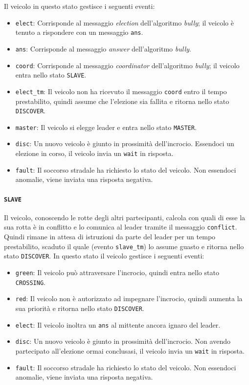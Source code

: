\documentclass{memoir}
\begin{document}
Il veicolo in questo stato gestisce i seguenti eventi:
\begin{itemize}
\item \texttt{elect}: Corrisponde al messaggio \emph{election} dell'algoritmo
  \emph{bully}; il veicolo è tenuto a rispondere con un messaggio \texttt{ans}.
\item \texttt{ans}: Corrisponde al messaggio \emph{answer} dell'algoritmo
  \emph{bully}.
\item \texttt{coord}: Corrisponde al messaggio \emph{coordinator} dell'algoritmo
  \emph{bully}; il veicolo entra nello stato \texttt{SLAVE}.
\item \texttt{elect\_tm}: Il veicolo non ha ricevuto il messaggio \texttt{coord}
  entro il tempo prestabilito, quindi assume che l'elezione sia fallita e
  ritorna nello stato \texttt{DISCOVER}.
\item \texttt{master}: Il veicolo si elegge leader e entra nello stato
  \texttt{MASTER}.
\item \texttt{disc}: Un nuovo veicolo è giunto in prossimità dell'incrocio.
  Essendoci un elezione in corso, il veicolo invia un \texttt{wait} in risposta.
\item \texttt{fault}: Il soccorso stradale ha richiesto lo stato del veicolo.
  Non essendoci anomalie, viene inviata una risposta negativa.
\end{itemize}

\paragraph{\texttt{SLAVE}}
Il veicolo, conoscendo le rotte degli altri partecipanti, calcola con quali di
esse la sua rotta è in conflitto e lo comunica al leader tramite il messaggio
\texttt{conflict}. Quindi rimane in attesa di istruzioni da parte del leader per
un tempo prestabilito, scaduto il quale (evento \texttt{slave\_tm}) lo assume
guasto e ritorna nello stato \texttt{DISCOVER}. In questo stato il veicolo
gestisce i seguenti eventi:
\begin{itemize}
\item \texttt{green}: Il veicolo può attraversare l'incrocio, quindi entra nello
  stato \texttt{CROSSING}.
\item \texttt{red}: Il veicolo non è autorizzato ad impegnare l'incrocio, quindi
  aumenta la sua priorità e ritorna nello stato \texttt{DISCOVER}.
\item \texttt{elect}: Il veicolo inoltra un \texttt{ans} al mittente ancora
  ignaro del leader.
\item \texttt{disc}: Un nuovo veicolo è giunto in prossimità dell'incrocio. Non
  avendo partecipato all'elezione ormai conclusasi, il veicolo invia un
  \texttt{wait} in risposta.
\item \texttt{fault}: Il soccorso stradale ha richiesto lo stato del veicolo.
  Non essendoci anomalie, viene inviata una risposta negativa.
\end{itemize}
\end{document}
